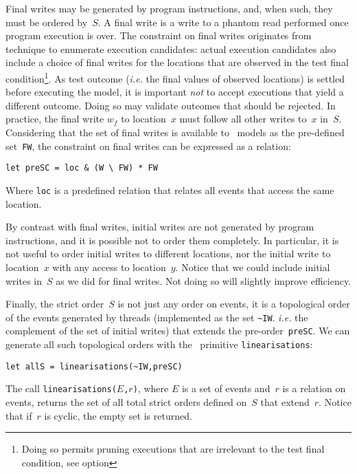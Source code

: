 Final writes may be  generated by program instructions, and, when such,
they must be ordered by~$S$.
A final write is a write to a phantom read performed once
program execution is over.
The constraint on final writes
originates from \herd{} technique to enumerate execution candidates:
actual execution candidates also include a choice of final writes for
the locations that are observed in the test final condition\footnote{Doing
so permits pruning executions that are irrelevant to the test final condition,
see \herd{} option }.
As test outcome (\emph{i.e.} the final values of observed locations) is
settled before executing the model, it is important \emph{not} to accept
executions that yield a different outcome. Doing so may validate outcomes
that should be rejected.
In practice, the final write $w_f$
to location~$x$ must follow all other writes to~$x$ in~$S$.
Considering that the set of final writes is available to \cat{}~models
as the pre-defined set~\verb+FW+,
the  constraint on final writes
can be expressed as a relation:
\begin{verbatim}
let preSC = loc & (W \ FW) * FW
\end{verbatim}
Where \verb+loc+ is a predefined relation that relates all events
that access the same location.

By contrast with final writes, initial writes are not generated
by program instructions, and it is possible not to order them completely.
In particular, it is not useful to order initial writes to different locations,
nor the initial write to location~$x$ with any access to location~$y$.
Notice that we could include initial writes in~$S$ as we did for
final writes. Not doing so will slightly improve efficiency.

\label{intro:linearisations}%
Finally, the strict order~$S$ is not just any order on events,
it is a topological order of the events generated by threads
(implemented as the set \verb+~IW+. \emph{i.e.} the complement of the set
of initial writes) that extends the pre-order~\verb+preSC+.
We can generate all such topological orders with the \cat{}~primitive
\verb+linearisations+:
\begin{verbatim}
let allS = linearisations(~IW,preSC)
\end{verbatim}
The call \texttt{linearisations($E$,$r$)}, where $E$ is a set of events
and~$r$ is a relation on events, returns the set of all total
strict orders defined on~$S$ that extend~$r$. Notice that if~$r$ is cyclic,
the empty set is  returned.

